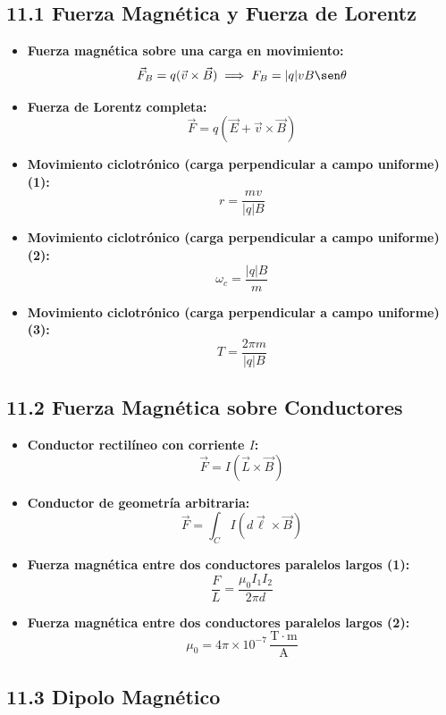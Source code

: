 \documentclass[11pt,a4paper]{article}
\begin{document}
\subsection*{11.1 Fuerza Magnética y Fuerza de Lorentz}

\begin{itemize}
  \item \textbf{Fuerza magnética sobre una carga en movimiento:}
  \[
    \vec{F}_B = q (\vec{v} \times \vec{B}) \implies F_B = |q| v B \sen\theta
  \]
  \item \textbf{Fuerza de Lorentz completa:}
  \[
    \vec{F} = q (\vec{E} + \vec{v} \times \vec{B})
  \]
  \item \textbf{Movimiento ciclotrónico (carga perpendicular a campo uniforme) (1):}
  \[
    r = \frac{m v}{|q| B}
  \]
  \item \textbf{Movimiento ciclotrónico (carga perpendicular a campo uniforme) (2):}
  \[
    \omega_c = \frac{|q| B}{m}
  \]
  \item \textbf{Movimiento ciclotrónico (carga perpendicular a campo uniforme) (3):}
  \[
    T = \frac{2\pi m}{|q| B}
  \]
\end{itemize}

\subsection*{11.2 Fuerza Magnética sobre Conductores}

\begin{itemize}
  \item \textbf{Conductor rectilíneo con corriente $I$:}
  \[
    \vec{F} = I (\vec{L} \times \vec{B})
  \]
  \item \textbf{Conductor de geometría arbitraria:}
  \[
    \vec{F} = \int_C I (d\vec{\ell} \times \vec{B})
  \]
  \item \textbf{Fuerza magnética entre dos conductores paralelos largos (1):}
  \[
    \frac{F}{L} = \frac{\mu_0 I_1 I_2}{2\pi d}
  \]
  \item \textbf{Fuerza magnética entre dos conductores paralelos largos (2):}
  \[
    \mu_0 = 4\pi \times 10^{-7} \, \frac{\mathrm{T}\cdot\mathrm{m}}{\mathrm{A}}
  \]
\end{itemize}

\subsection*{11.3 Dipolo Magnético}
\end{document}
